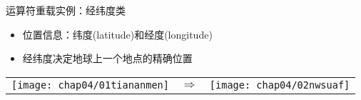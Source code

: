 \begin{frame}[t, fragile]{运算符重载}{实例：经纬度类}%
  \begin{spacing}{1.8}
  \begin{itemize}
  \item 位置信息：纬度(latitude)和经度(longitude)
  \item 经纬度决定地球上一个地点的精确位置    
  \end{itemize}  
  \begin{center}
    \begin{tabular}{ccc}
      \texttt{[image: chap04/01tiananmen]} & $\Rightarrow$ & \texttt{[image: chap04/02nwsuaf]}
    \end{tabular}
  \end{center}
  \end{spacing}
\end{frame}


